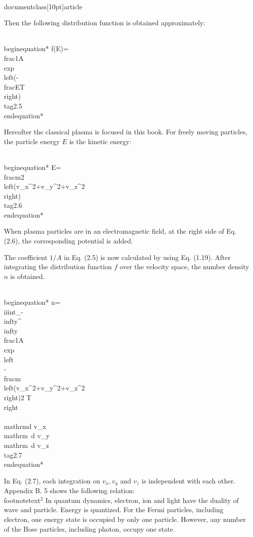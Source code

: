 \\documentclass[10pt]{article}
\begin{document}
Then the following distribution function is obtained approximately:


\\begin{equation*}
f(E)=\\frac{1}{A} \\exp \\left(-\\frac{E}{T}\\right) \\tag{2.5}
\\end{equation*}


Hereafter the classical plasma is focused in this book. For freely moving particles, the particle energy $E$ is the kinetic energy:


\\begin{equation*}
E=\\frac{m}{2}\\left(v_{x}^{2}+v_{y}^{2}+v_{z}^{2}\\right) \\tag{2.6}
\\end{equation*}


When plasma particles are in an electromagnetic field, at the right side of Eq. (2.6), the corresponding potential is added.

The coefficient $1 / A$ in Eq. (2.5) is now calculated by using Eq. (1.19). After integrating the distribution function $f$ over the velocity space, the number density $n$ is obtained.


\\begin{equation*}
n=\\iiint_{-\\infty}^{\\infty} \\frac{1}{A} \\exp \\left\\{-\\frac{m\\left(v_{x}^{2}+v_{y}^{2}+v_{z}^{2}\\right)}{2 T}\\right\\} \\mathrm{d} v_{x} \\mathrm{~d} v_{y} \\mathrm{~d} v_{z} \\tag{2.7}
\\end{equation*}


In Eq. (2.7), each integration on $v_{x}, v_{y}$ and $v_{z}$ is independent with each other. Appendix B. 5 shows the following relation:
\\footnotetext{${ }^{2}$ In quantum dynamics, electron, ion and light have the duality of wave and particle. Energy is quantized. For the Fermi particles, including electron, one energy state is occupied by only one particle. However, any number of the Bose particles, including photon, occupy one state.
}
\end{document}
